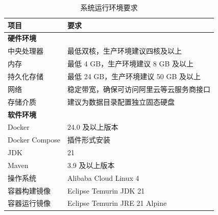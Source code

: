 \cleardoublepage

{

    \appendixsubsecmajornumbering


    \begin{table}[htbp]
      \centering
      \caption{系统运行环境要求}
      \label{tab:env-requirements}
      \begin{tabular}{p{4cm}p{9cm}}
        \hline
        项目 & 要求 \\
        \hline
        \multicolumn{2}{l}{\textbf{硬件环境}} \\
        中央处理器 & 最低双核，生产环境建议四核及以上 \\
        内存 & 最低 4 GB，生产环境建议 8 GB 及以上 \\
        持久化存储 & 最低 24 GB，生产环境建议 50 GB 及以上 \\
        网络 & 稳定带宽，确保可访问阿里云等云服务商接口 \\
        存储介质 & 建议为数据目录配置独立固态硬盘 \\
        \hline
        \multicolumn{2}{l}{\textbf{软件环境}} \\
        Docker & 24.0 及以上版本 \\
        Docker Compose & 插件形式安装 \\
        JDK & 21 \\
        Maven & 3.9 及以上版本 \\
        操作系统 & Alibaba Cloud Linux 4 \\
        容器构建镜像 & Eclipse Temurin JDK 21 \\
        容器运行镜像 & Eclipse Temurin JRE 21 Alpine \\
        \hline
      \end{tabular}
    \end{table}

}
